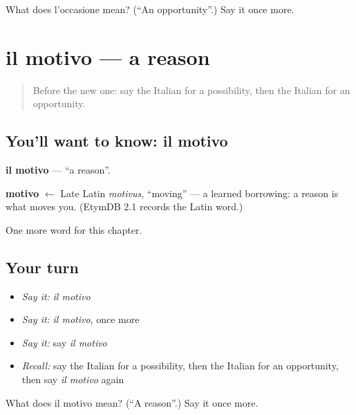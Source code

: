 \begin{tcolorbox}[breakable,colback=teal!4,colframe=teal!35!black,title={Before you move on}]
What does l'occasione mean? (\textquotedblleft{}An opportunity\textquotedblright{}.) Say it once more.
\end{tcolorbox}
\section[il motivo]{il motivo — a reason}

\label{lesson:IT-C225-motivo}



\begin{quote}
Before the new one: say the Italian for a possibility, then the Italian for an opportunity.
\end{quote}

\subsection*{You'll want to know: il motivo}
\textbf{il motivo} — \textquotedblleft{}a reason\textquotedblright{}.

\begin{cousinweb}
\textbf{motivo} $\leftarrow$ Late Latin \emph{motivus}, \textquotedblleft{}moving\textquotedblright{} — a learned borrowing: a reason is what moves you. (EtymDB 2.1 records the Latin word.)
\end{cousinweb}

\begin{grammarlens}[title={What you've built}]
One more word for this chapter.
\end{grammarlens}

\subsection*{Your turn}
\begin{itemize}
\raggedright
  \item \emph{Say it:} \emph{il motivo}
  \item \emph{Say it:} \emph{il motivo}, once more
  \item \emph{Say it:} say \emph{il motivo}
  \item \emph{Recall:} say the Italian for a possibility, then the Italian for an opportunity, then say \emph{il motivo} again
\end{itemize}

\begin{tcolorbox}[breakable,colback=teal!4,colframe=teal!35!black,title={Before you move on}]
What does il motivo mean? (\textquotedblleft{}A reason\textquotedblright{}.) Say it once more.
\end{tcolorbox}
